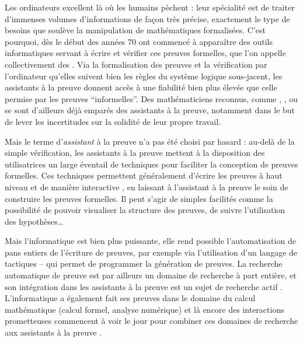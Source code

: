 Les ordinateurs excellent là où les humains pèchent : leur spécialité est de traiter
d’immenses volumes d’informations de façon très précise, exactement le type
de besoins que soulève la manipulation de mathématiques formalisées. C’est pourquoi, dès
le début des années 70%
ont commencé à apparaître des outils informatiques servant à écrire et vérifier ces
preuves formelles, que l’on appelle collectivement des .
Via la formalisation des preuves et la vérification par l’ordinateur qu’elles
suivent bien les règles du système logique sous-jacent, les assistants à la preuve
donnent accès à une fiabilité bien plus élevée que celle permise par les preuves
“informelles”.
Des mathématiciens reconnus, comme ,
, ou 
se sont d’ailleurs déjà emparés des assistants à la preuve,
notamment dans le but de lever les incertitudes
sur la solidité de leur propre travail.

Mais le terme d’\emph{assistant} à la preuve n’a pas été choisi par hasard : au-delà
de la simple vérification, les assistants à la preuve mettent à la disposition des 
utilisatrices un large éventail de techniques pour faciliter la conception de preuves formelles.
Ces techniques permettent généralement d’écrire
les preuves à haut niveau et de manière interactive%
, en laissant à l’assistant à la preuve le soin de construire les preuves formelles.
Il peut s’agir de simples facilités
comme la possibilité de pouvoir visualiser la structure des
preuves, de suivre l’utilisation des hypothèses…

Mais l’informatique est bien plus puissante, elle rend possible
l’automatisation de pans entiers de l’écriture de preuves,
par exemple via l’utilisation d’un langage de tactiques  –
qui permet de programmer la génération de preuves.
La recherche automatique de preuve est par ailleurs un domaine de recherche à part entière,
et son intégration dans les assistants à la
preuve est un sujet de recherche actif .
L’informatique a également fait ses preuves dans le domaine du calcul mathématique
(calcul formel, analyse numérique) et là encore des interactions prometteuses
commencent à voir le jour pour combiner ces domaines de recherche aux assistants à la preuve
.

